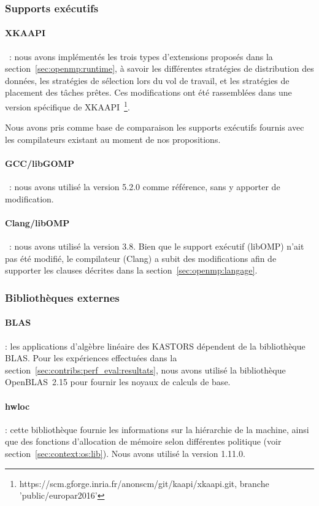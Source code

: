 \subsubsection{Supports exécutifs}


\paragraph{XKAAPI}~: nous avons implémentés les trois types d'extensions proposés dans la section~\ref{sec:openmp:runtime}, à savoir les différentes stratégies de distribution des données, les stratégies de sélection lors du vol de travail, et les stratégies de placement des tâches prêtes.
Ces modifications ont été rassemblées dans une version spécifique de XKAAPI~\footnote{https://scm.gforge.inria.fr/anonscm/git/kaapi/xkaapi.git, branche 'public/europar2016'}.


Nous avons pris comme base de comparaison les supports exécutifs fournis avec les compilateurs existant au moment de nos propositions.

\paragraph{GCC/libGOMP}~: nous avons utilisé la version 5.2.0 comme référence, sans y apporter de modification.

\paragraph{Clang/libOMP}~: nous avons utilisé la version 3.8. Bien que le support exécutif (libOMP) n'ait pas été modifié, le compilateur (Clang) a subit des modifications afin de supporter les clauses décrites dans la section~\ref{sec:openmp:langage}.

\subsubsection{Bibliothèques externes}

\paragraph{BLAS} : les applications d'algèbre linéaire des KASTORS dépendent de la bibliothèque BLAS.
Pour les expériences effectuées dans la section~\ref{sec:contribs:perf_eval:resultats}, nous avons utilisé la bibliothèque OpenBLAS~2.15 pour fournir les noyaux de calculs de base.


\paragraph{hwloc} : cette bibliothèque fournie les informations sur la hiérarchie de la machine, ainsi que des fonctions d'allocation de mémoire selon différentes politique (voir section~\ref{sec:context:os:lib}). Nous avons utilisé la version 1.11.0.

